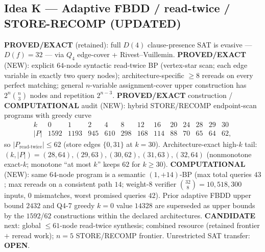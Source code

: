 \documentclass[11pt]{article}
\begin{document}
\subsection*{Idea K --- Adaptive FBDD / read-twice / STORE-RECOMP (UPDATED)}
\textbf{PROVED/EXACT} (retained): full $D(4)$ clause-presence SAT is evasive --- $D(f)=32$ --- via
$Q_4$ edge-cover + Rivest--Vuillemin.
\textbf{PROVED/EXACT} (NEW): explicit $64$-node syntactic read-twice BP (vertex-star scan;
each edge variable in exactly two query nodes); architecture-specific
$\ge8$ rereads on every perfect matching; general $n$-variable assignment-cover upper
construction has $2^n\binom{n}{3}$ nodes and repetition $2^{n-3}$.
\textbf{PROVED/EXACT} construction / \textbf{COMPUTATIONAL} audit (NEW): hybrid STORE/RECOMP
endpoint-scan programs with greedy curve
\[
\begin{array}{c|rrrrrrrrrrrr}
k&0&1&2&4&8&12&16&20&24&28&29&30\\
\hline
|P|&1592&1193&945&610&298&168&114&88&70&65&64&62,
\end{array}
\]
so $|P_{\mathrm{read\textrm{-}twice}}|\le62$ (store edges $\{0,31\}$ at $k=30$).
Architecture-exact high-$k$ tail: $(k,|P|)=(28,64),(29,63),(30,62),(31,63),(32,64)$
(nonmonotone exact-$k$; monotone ``at most $k$'' keeps $62$ for $k\ge30$).
\textbf{COMPUTATIONAL} (NEW): same $64$-node program is a semantic $(1,+14)$-BP
(max total queries $43$; max rereads on a consistent path $14$; weight-$8$ verifier
$\binom{32}{8}=10{,}518{,}300$ inputs, $0$ mismatches, worst promised queries $42$).
Prior adaptive FBDD upper bound $2432$ and Q4-7 greedy $k=0$ value $14328$ are superseded
as upper bounds by the $1592$/$62$ constructions within the declared architectures.
\textbf{CANDIDATE} next: global $\le61$-node read-twice synthesis; combined resource
(retained frontier $+$ reread work); $n=5$ STORE/RECOMP frontier.
Unrestricted SAT transfer: \textbf{OPEN}.
\end{document}
